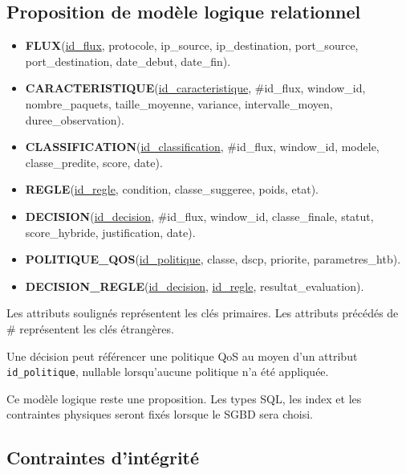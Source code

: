 \subsection{Proposition de modèle logique relationnel}

\begin{itemize}
    \item \textbf{FLUX}(\underline{id\_flux}, protocole,
    ip\_source, ip\_destination, port\_source,
    port\_destination, date\_debut, date\_fin).

    \item \textbf{CARACTERISTIQUE}(\underline{id\_caracteristique},
    \#id\_flux, window\_id, nombre\_paquets,
    taille\_moyenne, variance, intervalle\_moyen,
    duree\_observation).

    \item \textbf{CLASSIFICATION}(\underline{id\_classification},
    \#id\_flux, window\_id, modele, classe\_predite,
    score, date).

    \item \textbf{REGLE}(\underline{id\_regle}, condition,
    classe\_suggeree, poids, etat).

    \item \textbf{DECISION}(\underline{id\_decision},
    \#id\_flux, window\_id, classe\_finale, statut,
    score\_hybride, justification, date).

    \item \textbf{POLITIQUE\_QOS}(\underline{id\_politique},
    classe, dscp, priorite, parametres\_htb).

    \item \textbf{DECISION\_REGLE}(\underline{id\_decision},
    \underline{id\_regle}, resultat\_evaluation).
\end{itemize}

Les attributs soulignés représentent les clés primaires.
Les attributs précédés de \# représentent les clés étrangères.

Une décision peut référencer une politique QoS au moyen
d'un attribut \texttt{id\_politique}, nullable lorsqu'aucune
politique n'a été appliquée.

Ce modèle logique reste une proposition. Les types SQL,
les index et les contraintes physiques seront fixés
lorsque le SGBD sera choisi.

\subsection{Contraintes d'intégrité}

